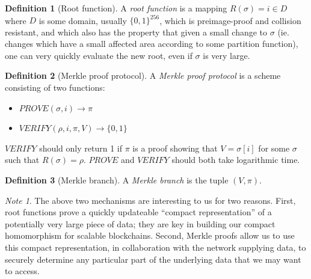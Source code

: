 \documentclass[11pt,a4paper]{article}
\theoremstyle{plain}
\theoremstyle{definition}
\newtheorem{defn}{Definition}[section]
\theoremstyle{remark}
\newtheorem*{note}{Note}
\begin{document}
\begin{defn}[Root function]
A \emph{root function} is a mapping $R(\sigma) = i \in D$ where $D$ is some domain, usually $\{0,1\}^{256}$, which is preimage-proof and collision resistant, and which also has the property that given a small change to $\sigma$ (ie. changes which have a small affected area according to some partition function), one can very quickly evaluate the new root, even if $\sigma$ is very large.
\end{defn}

\begin{defn}[Merkle proof protocol]
A \emph{Merkle proof protocol} is a scheme consisting of two functions:
\begin{itemize}
\item
$PROVE(\sigma, i) \rightarrow \pi$
\item
$VERIFY(\rho, i, \pi, V) \rightarrow \{0, 1\}$
\end{itemize}
$VERIFY$ should only return 1 if $\pi$ is a proof showing that $V = \sigma[i]$ for some $\sigma$ such that $R(\sigma) = \rho$. $PROVE$ and $VERIFY$ should both take logarithmic time.
\end{defn}

\begin{defn}[Merkle branch]
A \emph{Merkle branch} is the tuple $(V, \pi)$.
\end{defn}

\begin{note}
The above two mechanisms are interesting to us for two reasons. First, root functions prove a quickly updateable ``compact representation'' of a potentially very large piece of data; they are key in building our compact homomorphism for scalable blockchains. Second, Merkle proofs allow us to use this compact representation, in collaboration with the network supplying data, to securely determine any particular part of the underlying data that we may want to access.
\end{note}
\end{document}
